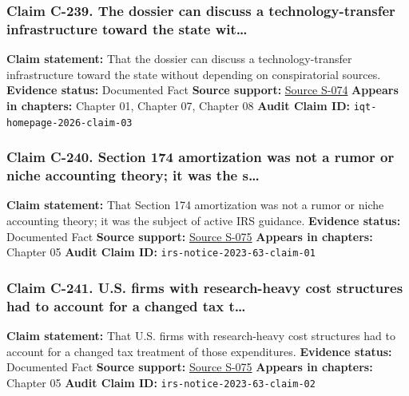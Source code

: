 \documentclass[
  american,
  11pt,
  letterpaper,
]{article}
\begin{document}
\subsubsection{Claim C-239. The dossier can discuss a
technology-transfer infrastructure toward the state
wit\ldots{}}\label{claim-c-239-the-dossier-can-discuss-a-technology-transfer-infrastructure-toward-the-state-wit}

\textbf{Claim statement:} That the dossier can discuss a
technology-transfer infrastructure toward the state without depending on
conspiratorial sources. \textbf{Evidence status:} Documented Fact
\textbf{Source support:} \hyperref[source-s-074-in-q-tel]{Source S-074}
\textbf{Appears in chapters:} Chapter 01, Chapter 07, Chapter 08
\textbf{Audit Claim ID:} \texttt{iqt-homepage-2026-claim-03}

\subsubsection{Claim C-240. Section 174 amortization was not a rumor or
niche accounting theory; it was the
s\ldots{}}\label{claim-c-240-section-174-amortization-was-not-a-rumor-or-niche-accounting-theory-it-was-the-s}

\textbf{Claim statement:} That Section 174 amortization was not a rumor
or niche accounting theory; it was the subject of active IRS guidance.
\textbf{Evidence status:} Documented Fact \textbf{Source support:}
\hyperref[source-s-075-notice-2023-63-guidance-on-section-174-and-specified-research-or-experimental-expenditures]{Source
S-075} \textbf{Appears in chapters:} Chapter 05 \textbf{Audit Claim ID:}
\texttt{irs-notice-2023-63-claim-01}

\subsubsection{Claim C-241. U.S. firms with research-heavy cost
structures had to account for a changed tax
t\ldots{}}\label{claim-c-241-u-s-firms-with-research-heavy-cost-structures-had-to-account-for-a-changed-tax-t}

\textbf{Claim statement:} That U.S. firms with research-heavy cost
structures had to account for a changed tax treatment of those
expenditures. \textbf{Evidence status:} Documented Fact \textbf{Source
support:}
\hyperref[source-s-075-notice-2023-63-guidance-on-section-174-and-specified-research-or-experimental-expenditures]{Source
S-075} \textbf{Appears in chapters:} Chapter 05 \textbf{Audit Claim ID:}
\texttt{irs-notice-2023-63-claim-02}
\end{document}
